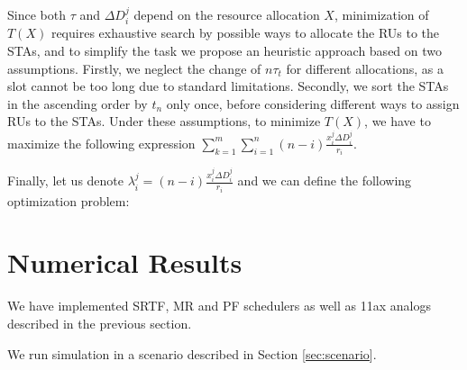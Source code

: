 
Since both $\tau$ and  $\Delta D_i^j$ depend on the resource allocation $X$, minimization of $T(X)$ requires exhaustive search by possible ways to allocate the RUs to the STAs, and to simplify the task we propose an heuristic approach based on two assumptions.
Firstly, we neglect the change of $n \tau_t$ for different allocations, as a slot cannot be too long due to standard limitations.
Secondly, we sort the STAs in the ascending order by $t_n$ only once, before considering different ways to assign RUs to the STAs.
Under these assumptions, to minimize  $T(X)$, we have to maximize the following expression $\sum_{k = 1}^{m} \sum_{i = 1}^{n } \left(n - i\right) \frac{x_i^j \Delta D_i^j}{r_{i}}$.

Finally, let us denote $\lambda_i^j = \left(n - i\right) \frac{x_i^j \Delta D_i^j}{r_{i}}$ and we can define the following optimization problem:

\section{Numerical Results}
\label{sec:numerical}


We have implemented SRTF, MR and PF schedulers as well as 11ax analogs described in the previous section.

We run simulation in a scenario described in Section \ref{sec:scenario}.

